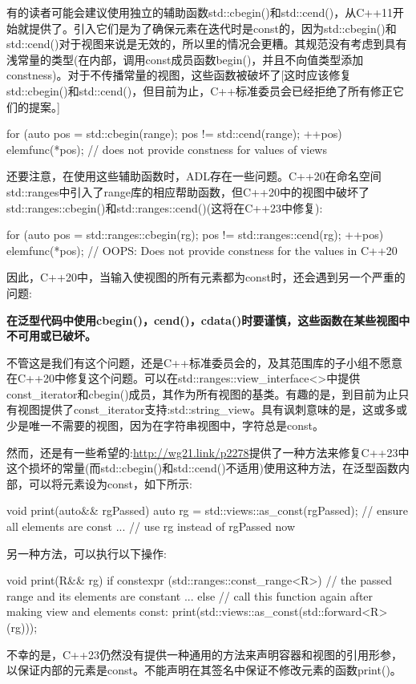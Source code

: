 有的读者可能会建议使用独立的辅助函数std::cbegin()和std::cend()，从C++11开始就提供了。引入它们是为了确保元素在迭代时是const的，因为std::cbegin()和std::cend()对于视图来说是无效的，所以里的情况会更糟。其规范没有考虑到具有浅常量的类型(在内部，调用const成员函数begin()，并且不向值类型添加constness)。对于不传播常量的视图，这些函数被破坏了[这时应该修复std::cbegin()和std::cend()，但目前为止，C++标准委员会已经拒绝了所有修正它们的提案。]

\begin{cpp}
for (auto pos = std::cbegin(range); pos != std::cend(range); ++pos) {
	elemfunc(*pos); // does not provide constness for values of views
}
\end{cpp}

还要注意，在使用这些辅助函数时，ADL存在一些问题。C++20在命名空间std::ranges中引入了range库的相应帮助函数，但C++20中的视图中破坏了std::ranges::cbegin()和std::ranges::cend()(这将在C++23中修复):

\begin{cpp}
for (auto pos = std::ranges::cbegin(rg); pos != std::ranges::cend(rg); ++pos) {
	elemfunc(*pos); // OOPS: Does not provide constness for the values in C++20
}
\end{cpp}

因此，C++20中，当输入使视图的所有元素都为const时，还会遇到另一个严重的问题:

\textbf{在泛型代码中使用cbegin()，cend()，cdata()时要谨慎，这些函数在某些视图中不可用或已破坏。}

不管这是我们有这个问题，还是C++标准委员会的，及其范围库的子小组不愿意在C++20中修复这个问题。可以在std::ranges::view\_interface<>中提供const\_iterator和cbegin()成员，其作为所有视图的基类。有趣的是，到目前为止只有视图提供了const\_iterator支持:std::string\_view。具有讽刺意味的是，这或多或少是唯一不需要的视图，因为在字符串视图中，字符总是const。

然而，还是有一些希望的:\url{http://wg21.link/p2278}提供了一种方法来修复C++23中这个损坏的常量(而std::cbegin()和std::cend()不适用)使用这种方法，在泛型函数内部，可以将元素设为const，如下所示:

\begin{cpp}
void print(auto&& rgPassed)
{
	auto rg = std::views::as_const(rgPassed); // ensure all elements are const
	... // use rg instead of rgPassed now
}
\end{cpp}

另一种方法，可以执行以下操作:

\begin{cpp}
void print(R&& rg)
{
	if constexpr (std::ranges::const_range<R>) {
		// the passed range and its elements are constant
		...
	}
	else {
		// call this function again after making view and elements const:
		print(std::views::as_const(std::forward<R>(rg)));
	}
}
\end{cpp}

不幸的是，C++23仍然没有提供一种通用的方法来声明容器和视图的引用形参，以保证内部的元素是const。不能声明在其签名中保证不修改元素的函数print()。

